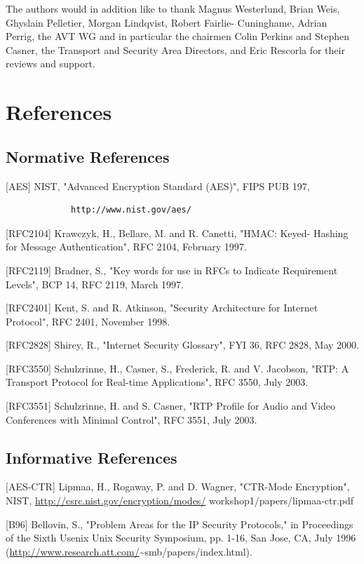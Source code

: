 \documentclass{article}
\begin{document}
The authors would in addition like to thank Magnus Westerlund, Brian Weis, Ghyslain Pelletier, Morgan Lindqvist, Robert Fairlie- Cuninghame, Adrian Perrig, the AVT WG and in particular the chairmen Colin Perkins and Stephen Casner, the Transport and Security Area Directors, and Eric Rescorla for their reviews and support.

\section{References}

\subsection{Normative References}

[AES]     NIST, "Advanced Encryption Standard (AES)", FIPS PUB 197,

\begin{verbatim}
             http://www.nist.gov/aes/
\end{verbatim}

[RFC2104] Krawczyk, H., Bellare, M. and R. Canetti, "HMAC:  Keyed- Hashing for Message Authentication", RFC 2104, February 1997.

[RFC2119] Bradner, S., "Key words for use in RFCs to Indicate Requirement Levels", BCP 14, RFC 2119, March 1997.

[RFC2401] Kent, S. and R. Atkinson, "Security Architecture for Internet Protocol", RFC 2401, November 1998.

[RFC2828] Shirey, R., "Internet Security Glossary", FYI 36, RFC 2828, May 2000.

[RFC3550] Schulzrinne, H., Casner, S., Frederick, R. and V. Jacobson, "RTP: A Transport Protocol for Real-time Applications", RFC 3550, July 2003.

[RFC3551] Schulzrinne, H. and S. Casner, "RTP Profile for Audio and Video Conferences with Minimal Control",  RFC 3551, July 2003.

\subsection{Informative References}

[AES-CTR] Lipmaa, H., Rogaway, P. and D. Wagner, "CTR-Mode Encryption", NIST, \url{http://csrc.nist.gov/encryption/modes/} workshop1/papers/lipmaa-ctr.pdf

[B96]     Bellovin, S., "Problem Areas for the IP Security Protocols," in Proceedings of the Sixth Usenix Unix Security Symposium, pp. 1-16, San Jose, CA, July 1996 (\url{http://www.research.att.com/}\textasciitilde{}smb/papers/index.html).
\end{document}

